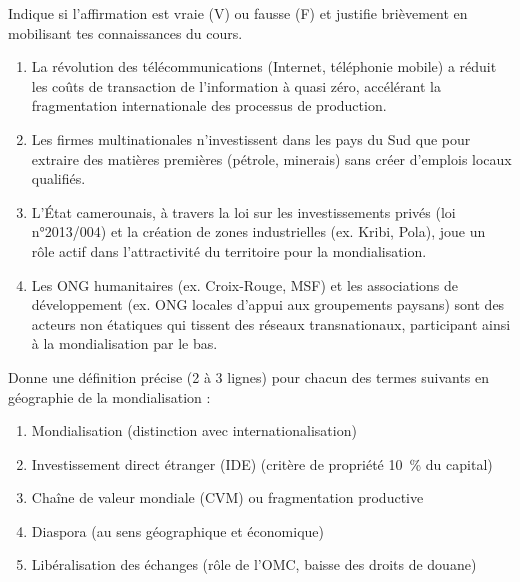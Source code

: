 \documentclass[11pt]{article}
\newcommand{\cle}[1]{{\popxbold\color{popdark}#1}}
\begin{document}
\begin{exercice}
Indique si l'affirmation est vraie (V) ou fausse (F) et justifie brièvement en mobilisant tes connaissances du cours.
\begin{enumerate}
    \item La révolution des télécommunications (Internet, téléphonie mobile) a réduit les coûts de transaction de l'information à quasi zéro, accélérant la fragmentation internationale des processus de production.
    \item Les firmes multinationales n'investissent dans les pays du Sud que pour extraire des matières premières (pétrole, minerais) sans créer d'emplois locaux qualifiés.
    \item L'État camerounais, à travers la loi sur les investissements privés (loi n°2013/004) et la création de zones industrielles (ex. Kribi, Pola), joue un rôle actif dans l'attractivité du territoire pour la mondialisation.
    \item Les ONG humanitaires (ex. Croix-Rouge, MSF) et les associations de développement (ex. ONG locales d'appui aux groupements paysans) sont des acteurs non étatiques qui tissent des réseaux transnationaux, participant ainsi à la mondialisation par le bas.
\end{enumerate}
\end{exercice}

\begin{exercice}
Donne une définition précise (2 à 3 lignes) pour chacun des termes suivants en géographie de la mondialisation :
\begin{enumerate}
    \item \cle{Mondialisation} (distinction avec \cle{internationalisation})
    \item \cle{Investissement direct étranger (IDE)} (critère de propriété \SI{10}{\%} du capital)
    \item \cle{Chaîne de valeur mondiale (CVM)} ou \cle{fragmentation productive}
    \item \cle{Diaspora} (au sens géographique et économique)
    \item \cle{Libéralisation des échanges} (rôle de l'OMC, baisse des droits de douane)
\end{enumerate}
\end{exercice}
\end{document}
